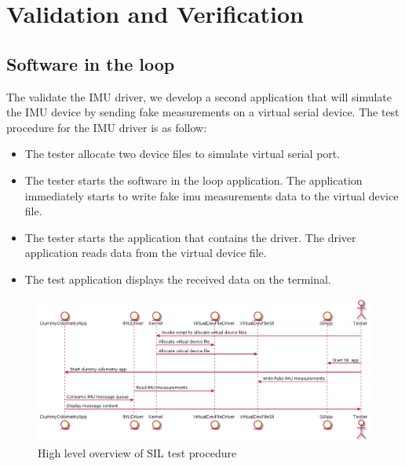 \section{Validation and Verification}
\subsection{Software in the loop}
The validate the IMU driver, we develop a second application that will simulate the IMU device by sending fake measurements on a virtual serial device.
The test procedure for the IMU driver is as follow:
\begin{itemize}
    \item The tester allocate two device files to simulate virtual serial port.
    \item The tester starts the software in the loop application. The application immediately starts to write fake imu measurements data to the virtual device file.
    \item The tester starts the application that contains the driver. The driver application reads data from the virtual device file.
    \item The test application displays the received data on the terminal.
\end{itemize}



\begin{figure}[ht]
    \centering
    \includegraphics[width=0.75 \textwidth]{diagrams/software_in_the_loop.png}
    \caption{High level overview of SIL test procedure}
    \label{reference}
\end{figure}
